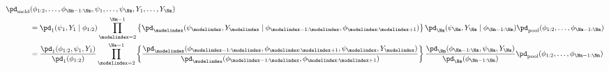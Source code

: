 \begin{align}
  \pd_{\text{meld}} &(\phi_{1:2}, \ldots, \phi_{\Nm - 1:\Nm}, \psi_{1}, \ldots, \psi_{\Nm}, Y_{1}, \ldots, Y_{\Nm}) \\  &=   
    \pd_{1} (\psi_{1}, Y_{1} \mid \phi_{1:2})
    \prod_{\modelindex = 2}^{\Nm - 1} \left\{
      \pd_{\modelindex} (\psi_{\modelindex}, Y_{\modelindex} \mid \phi_{\modelindex - 1:\modelindex}, \phi_{\modelindex:\modelindex + 1})
    \right\}
    \pd_{\Nm} (\psi_{\Nm}, Y_{\Nm} \mid \phi_{\Nm - 1:\Nm})  
    \pd_{\text{pool}}(\phi_{1:2}, \ldots, \phi_{\Nm - 1:\Nm})
    \\ &= 
    \frac {
      \pd_{1} (\phi_{1:2}, \psi_{1}, Y_{1})
    } {
      \pd_{1}(\phi_{1:2})
    }
    \prod_{\modelindex = 2}^{\Nm - 1} \left\{
      \frac {
        \pd_{\modelindex} (\phi_{\modelindex - 1:\modelindex}, \phi_{\modelindex:\modelindex + 1}, \psi_{\modelindex}, Y_{\modelindex})
      } {
        \pd_{\modelindex}(\phi_{\modelindex - 1:\modelindex}, \phi_{\modelindex:\modelindex + 1})
      }
    \right\}
    \frac {
      \pd_{\Nm} (\phi_{\Nm - 1:\Nm}, \psi_{\Nm}, Y_{\Nm})
    } {
      \pd_{\Nm}(\phi_{\Nm - 1:\Nm})
    }
    \pd_{\text{pool}}(\phi_{1:2}, \ldots, \phi_{\Nm - 1:\Nm})
  \label{eqn:melded-model-general}
\end{align}